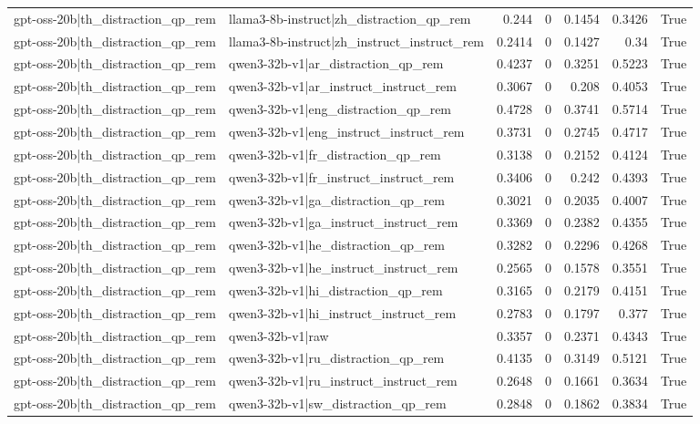 \begin{table}
\begin{tabular}{l l r r r r l}
gpt-oss-20b|th_distraction_qp_rem & llama3-8b-instruct|zh_distraction_qp_rem & 0.244 & 0 & 0.1454 & 0.3426 & True \\
gpt-oss-20b|th_distraction_qp_rem & llama3-8b-instruct|zh_instruct_instruct_rem & 0.2414 & 0 & 0.1427 & 0.34 & True \\
gpt-oss-20b|th_distraction_qp_rem & qwen3-32b-v1|ar_distraction_qp_rem & 0.4237 & 0 & 0.3251 & 0.5223 & True \\
gpt-oss-20b|th_distraction_qp_rem & qwen3-32b-v1|ar_instruct_instruct_rem & 0.3067 & 0 & 0.208 & 0.4053 & True \\
gpt-oss-20b|th_distraction_qp_rem & qwen3-32b-v1|eng_distraction_qp_rem & 0.4728 & 0 & 0.3741 & 0.5714 & True \\
gpt-oss-20b|th_distraction_qp_rem & qwen3-32b-v1|eng_instruct_instruct_rem & 0.3731 & 0 & 0.2745 & 0.4717 & True \\
gpt-oss-20b|th_distraction_qp_rem & qwen3-32b-v1|fr_distraction_qp_rem & 0.3138 & 0 & 0.2152 & 0.4124 & True \\
gpt-oss-20b|th_distraction_qp_rem & qwen3-32b-v1|fr_instruct_instruct_rem & 0.3406 & 0 & 0.242 & 0.4393 & True \\
gpt-oss-20b|th_distraction_qp_rem & qwen3-32b-v1|ga_distraction_qp_rem & 0.3021 & 0 & 0.2035 & 0.4007 & True \\
gpt-oss-20b|th_distraction_qp_rem & qwen3-32b-v1|ga_instruct_instruct_rem & 0.3369 & 0 & 0.2382 & 0.4355 & True \\
gpt-oss-20b|th_distraction_qp_rem & qwen3-32b-v1|he_distraction_qp_rem & 0.3282 & 0 & 0.2296 & 0.4268 & True \\
gpt-oss-20b|th_distraction_qp_rem & qwen3-32b-v1|he_instruct_instruct_rem & 0.2565 & 0 & 0.1578 & 0.3551 & True \\
gpt-oss-20b|th_distraction_qp_rem & qwen3-32b-v1|hi_distraction_qp_rem & 0.3165 & 0 & 0.2179 & 0.4151 & True \\
gpt-oss-20b|th_distraction_qp_rem & qwen3-32b-v1|hi_instruct_instruct_rem & 0.2783 & 0 & 0.1797 & 0.377 & True \\
gpt-oss-20b|th_distraction_qp_rem & qwen3-32b-v1|raw & 0.3357 & 0 & 0.2371 & 0.4343 & True \\
gpt-oss-20b|th_distraction_qp_rem & qwen3-32b-v1|ru_distraction_qp_rem & 0.4135 & 0 & 0.3149 & 0.5121 & True \\
gpt-oss-20b|th_distraction_qp_rem & qwen3-32b-v1|ru_instruct_instruct_rem & 0.2648 & 0 & 0.1661 & 0.3634 & True \\
gpt-oss-20b|th_distraction_qp_rem & qwen3-32b-v1|sw_distraction_qp_rem & 0.2848 & 0 & 0.1862 & 0.3834 & True \\

\end{tabular}
\end{table}
